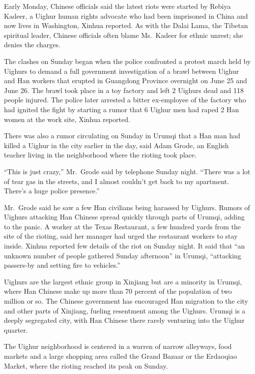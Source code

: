 ﻿\documentclass[12pt]{article}
\begin{document}
Early Monday, Chinese officials said the latest riots were started by Rebiya Kadeer, a Uighur human
rights advocate who had been imprisoned in China and now lives in Washington, Xinhua reported. As
with the Dalai Lama, the Tibetan spiritual leader, Chinese officials often blame Ms.~Kadeer for
ethnic unrest; she denies the charges.

The clashes on Sunday began when the police confronted a protest march held by Uighurs to demand a
full government investigation of a brawl between Uighur and Han workers that erupted in Guangdong
Province overnight on June 25 and June 26. The brawl took place in a toy factory and left 2 Uighurs
dead and 118 people injured. The police later arrested a bitter ex-employee of the factory who had
ignited the fight by starting a rumor that 6 Uighur men had raped 2 Han women at the work site,
Xinhua reported.

There was also a rumor circulating on Sunday in Urumqi that a Han man had killed a Uighur in the
city earlier in the day, said Adam Grode, an English teacher living in the neighborhood where the
rioting took place.

``This is just crazy,'' Mr.~Grode said by telephone Sunday night. ``There was a lot of tear gas in
the streets, and I almost couldn't get back to my apartment. There's a huge police presence.''

Mr.~Grode said he saw a few Han civilians being harassed by Uighurs. Rumors of Uighurs attacking Han
Chinese spread quickly through parts of Urumqi, adding to the panic. A worker at the Texas
Restaurant, a few hundred yards from the site of the rioting, said her manager had urged the
restaurant workers to stay inside. Xinhua reported few details of the riot on Sunday night. It said
that ``an unknown number of people gathered Sunday afternoon'' in Urumqi, ``attacking passers-by and
setting fire to vehicles.''

Uighurs are the largest ethnic group in Xinjiang but are a minority in Urumqi, where Han Chinese
make up more than 70 percent of the population of two million or so. The Chinese government has
encouraged Han migration to the city and other parts of Xinjiang, fueling resentment among the
Uighurs. Urumqi is a deeply segregated city, with Han Chinese there rarely venturing into the Uighur
quarter.

The Uighur neighborhood is centered in a warren of narrow alleyways, food markets and a large
shopping area called the Grand Bazaar or the Erdaoqiao Market, where the rioting reached its peak on
Sunday.
\end{document}
